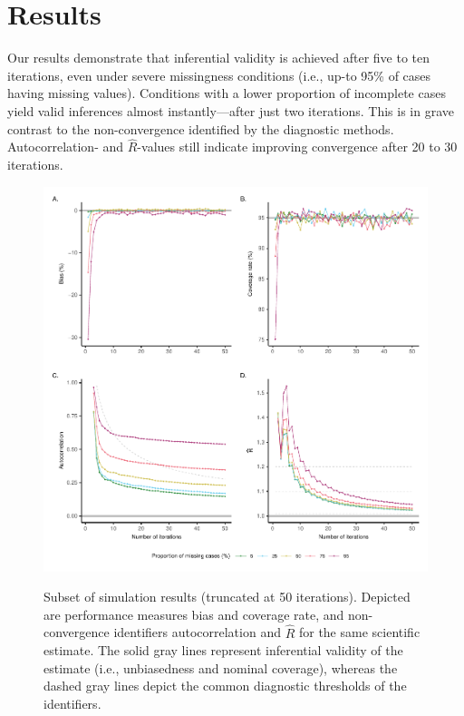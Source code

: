 \documentclass{article}
\begin{document}
\section{Results}
\label{results}

Our results demonstrate that inferential validity is achieved after five to ten iterations, even under severe missingness conditions (i.e., up-to 95\% of cases having missing values). Conditions with a lower proportion of incomplete cases yield valid inferences almost instantly---after just two iterations. This is in grave contrast to the non-convergence identified by the diagnostic methods. Autocorrelation- and $\widehat{R}$-values still indicate improving convergence after 20 to 30 iterations. 


\begin{figure}
{\centering \includegraphics{Figures/resultssquare} 
}
\caption{Subset of simulation results (truncated at 50 iterations). Depicted are performance measures bias and coverage rate, and non-convergence identifiers autocorrelation and $\widehat{R}$ for the same scientific estimate. The solid gray lines represent inferential validity of the estimate (i.e., unbiasedness and nominal coverage), whereas the dashed gray lines depict the common diagnostic thresholds of the identifiers.}\label{fig:res}
\end{figure}
\end{document}

